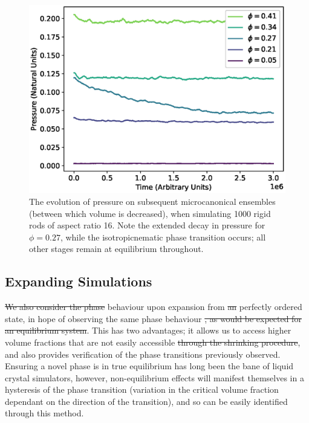 \documentclass[11pt, a4paper]{article} %
\providecommand{\DIFadd}[1]{{\protect\color{blue}\uwave{#1}}} %
\providecommand{\DIFdel}[1]{{\protect\color{red}\sout{#1}}}                      %
\providecommand{\DIFaddbegin}{} %
\providecommand{\DIFaddend}{} %
\providecommand{\DIFdelbegin}{} %
\providecommand{\DIFdelend}{} %
\begin{document}
\begin{figure} [h!]
	\centering
	\includegraphics[width=0.7\linewidth]{Figures/rigidrod_pressureevo}
	\caption{The evolution of pressure on subsequent microcanonical ensembles (between which volume is decreased), when simulating 1000 rigid rods of aspect ratio 16. Note the extended decay in pressure for $\phi  = 0.27$, while the isotropic\textendash nematic phase transition occurs; all other stages remain at equilibrium throughout.}
	\label{fig:rr_pressureevo}
\end{figure} %



\subsection{Expanding Simulations}

\DIFdelbegin \DIFdel{We also consider the phase }\DIFdelend \DIFaddbegin \DIFadd{\textcolor{forestgreen}{We also consider the phase} }\DIFaddend behaviour upon expansion from \DIFdelbegin \DIFdel{an }\DIFdelend \DIFaddbegin \DIFadd{a }\DIFaddend perfectly ordered state, in hope of observing the same phase behaviour \DIFdelbegin \DIFdel{, as would be expected for an equilibrium system}\DIFdelend \DIFaddbegin \DIFadd{\textcolor{forestgreen}{ expected for an equilibrium system}}\DIFaddend . This has two advantages; it allows us to access higher volume fractions that are not easily accessible \DIFdelbegin \DIFdel{through the shrinking procedure}\DIFdelend \DIFaddbegin \DIFadd{\textcolor{forestgreen}{through the shrinking procedure}}\DIFaddend , and also provides verification of the phase transitions previously observed. Ensuring a novel phase is in true equilibrium has long been the bane of liquid crystal simulators, however, non-equilibrium effects will manifest themselves in a hysteresis of the phase transition (variation in the critical volume fraction dependant on the direction of the transition), and so can be easily identified through this method.
\end{document}
